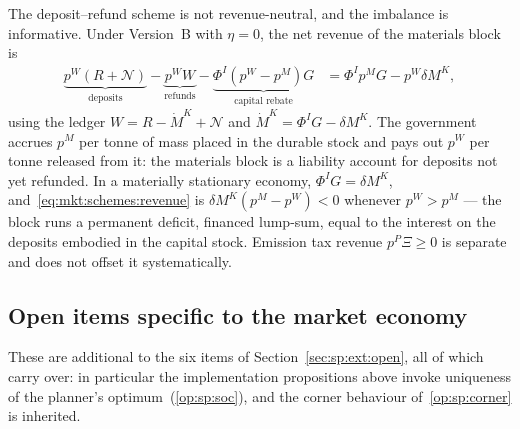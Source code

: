 \begin{remark}\label{rem:mkt:revenue}
The deposit--refund scheme is not revenue-neutral, and the imbalance is informative. Under Version~B
with $\eta=0$, the net revenue of the materials block is
\begin{align}
\underbrace{p^W\left(R+\mathcal N\right)}_{\text{deposits}}
-\underbrace{p^WW}_{\text{refunds}}
-\underbrace{\Phi^I\left(p^W-p^M\right)G}_{\text{capital rebate}}
&= \Phi^Ip^MG-p^W\delta M^K,
\label{eq:mkt:schemes:revenue}
\end{align}
using the ledger $W=R-\dot M^K+\mathcal N$ and $\dot M^K=\Phi^IG-\delta M^K$. The government accrues
$p^M$ per tonne of mass placed in the durable stock and pays out $p^W$ per tonne released from it: the
materials block is a liability account for deposits not yet refunded. In a materially stationary
economy, $\Phi^IG=\delta M^K$, and~\eqref{eq:mkt:schemes:revenue} is $\delta M^K\left(p^M-p^W\right)<0$
whenever $p^W>p^M$ --- the block runs a permanent deficit, financed lump-sum, equal to the interest on
the deposits embodied in the capital stock. Emission tax revenue $p^P\Xi\ge0$ is separate and does not
offset it systematically.
\end{remark}


\subsection{Open items specific to the market economy}\label{sec:mkt:open}

These are additional to the six items of Section~\ref{sec:sp:ext:open}, all of which carry over: in
particular the implementation propositions above invoke uniqueness of the planner's
optimum~(\ref{op:sp:soc}), and the corner behaviour of~\ref{op:sp:corner} is inherited.

